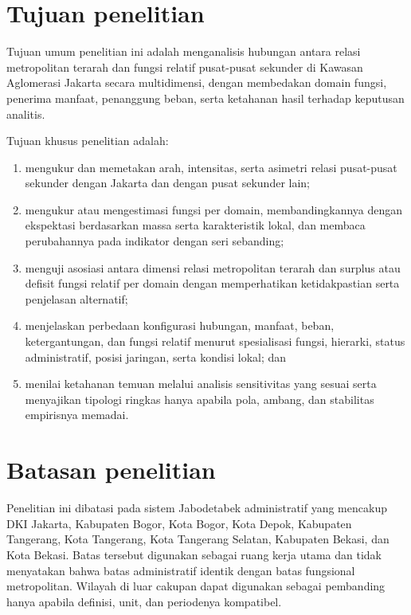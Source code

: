 \documentclass[11pt,a4paper,oneside,openany,indonesian]{report}
\begin{document}
\section{Tujuan penelitian}

Tujuan umum penelitian ini adalah menganalisis hubungan antara relasi metropolitan terarah dan fungsi relatif pusat-pusat sekunder di Kawasan Aglomerasi Jakarta secara multidimensi, dengan membedakan domain fungsi, penerima manfaat, penanggung beban, serta ketahanan hasil terhadap keputusan analitis.

Tujuan khusus penelitian adalah:

\begin{enumerate}
  \item mengukur dan memetakan arah, intensitas, serta asimetri relasi pusat-pusat sekunder dengan Jakarta dan dengan pusat sekunder lain;
  \item mengukur atau mengestimasi fungsi per domain, membandingkannya dengan ekspektasi berdasarkan massa serta karakteristik lokal, dan membaca perubahannya pada indikator dengan seri sebanding;
  \item menguji asosiasi antara dimensi relasi metropolitan terarah dan surplus atau defisit fungsi relatif per domain dengan memperhatikan ketidakpastian serta penjelasan alternatif;
  \item menjelaskan perbedaan konfigurasi hubungan, manfaat, beban, ketergantungan, dan fungsi relatif menurut spesialisasi fungsi, hierarki, status administratif, posisi jaringan, serta kondisi lokal; dan
  \item menilai ketahanan temuan melalui analisis sensitivitas yang sesuai serta menyajikan tipologi ringkas hanya apabila pola, ambang, dan stabilitas empirisnya memadai.
\end{enumerate}

\section{Batasan penelitian}

Penelitian ini dibatasi pada sistem Jabodetabek administratif yang mencakup DKI Jakarta, Kabupaten Bogor, Kota Bogor, Kota Depok, Kabupaten Tangerang, Kota Tangerang, Kota Tangerang Selatan, Kabupaten Bekasi, dan Kota Bekasi. Batas tersebut digunakan sebagai ruang kerja utama dan tidak menyatakan bahwa batas administratif identik dengan batas fungsional metropolitan. Wilayah di luar cakupan dapat digunakan sebagai pembanding hanya apabila definisi, unit, dan periodenya kompatibel.
\end{document}
